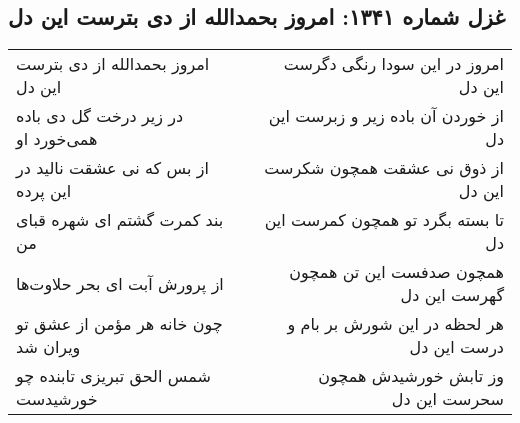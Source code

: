 \begin{center}
\section*{غزل شماره ۱۳۴۱: امروز بحمدالله از دی بترست این دل}
\label{sec:1341}
\begin{longtable}{l p{0.5cm} r}
امروز بحمدالله از دی بترست این دل
&&
امروز در این سودا رنگی دگرست این دل
\\
در زیر درخت گل دی باده همی‌خورد او
&&
از خوردن آن باده زیر و زبرست این دل
\\
از بس که نی عشقت نالید در این پرده
&&
از ذوق نی عشقت همچون شکرست این دل
\\
بند کمرت گشتم ای شهره قبای من
&&
تا بسته بگرد تو همچون کمرست این دل
\\
از پرورش آبت ای بحر حلاوت‌ها
&&
همچون صدفست این تن همچون گهرست این دل
\\
چون خانه هر مؤمن از عشق تو ویران شد
&&
هر لحظه در این شورش بر بام و درست این دل
\\
شمس الحق تبریزی تابنده چو خورشیدست
&&
وز تابش خورشیدش همچون سحرست این دل
\\
\end{longtable}
\end{center}

